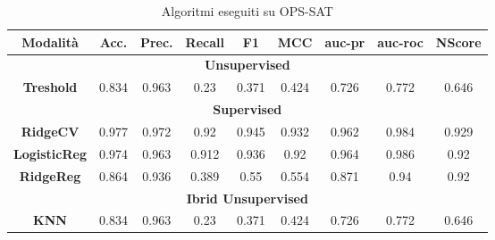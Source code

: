 \begin{table}[h]
    \centering
    \begin{tabular}{|c|c|c|c|c|c|c|c|c|}
    \hline
 \textbf{Modalità} & \textbf{Acc.} &\textbf{Prec.}  & \textbf{Recall} & \textbf{F1} & \textbf{MCC} & \textbf{auc-pr} & \textbf{auc-roc} & \textbf{NScore}\\
 \hline
        \multicolumn{9}{|c|}{\textbf{Unsupervised}} \\
        \hline
        \textbf{Treshold} & 0.834 & 0.963 & 0.23 &0.371  & 0.424 & 0.726& 0.772 &0.646 \\
        \hline
        \multicolumn{9}{|c|}{\textbf{Supervised}} \\
        \hline
         \textbf{RidgeCV} & 0.977 & 0.972 & 0.92 &0.945  & 0.932 & 0.962& 0.984 &0.929 \\
        \hline
        \textbf{LogisticReg} & 0.974 & 0.963 & 0.912 &0.936  & 0.92 & 0.964& 0.986 &0.92 \\
        \hline
        \textbf{RidgeReg} & 0.864 & 0.936 & 0.389 &0.55  & 0.554 & 0.871& 0.94 &0.92 \\
        \hline
        \multicolumn{9}{|c|}{\textbf{Ibrid Unsupervised}} \\
        \hline
        \textbf{KNN} & 0.834 & 0.963 & 0.23 &0.371  & 0.424 & 0.726& 0.772 &0.646 \\
        \hline
    \end{tabular}
    \label{tab:RocketOPS_SAT}
    \caption{Algoritmi eseguiti su OPS-SAT}
\end{table}